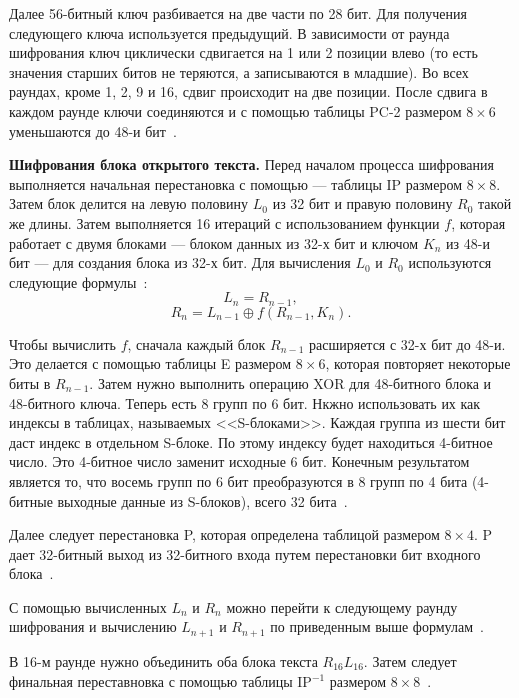\documentclass{bmstu}
\begin{document}
Далее 56-битный ключ разбивается на две части по 28 бит. 
Для получения следующего ключа используется предыдущий. 
В зависимости от раунда шифрования ключ циклически сдвигается на 1 или 2 позиции влево (то есть значения старших битов не теряются, а записываются в младшие). 
Во всех раундах, кроме 1, 2, 9 и 16, сдвиг происходит на две позиции. 
После сдвига в каждом раунде ключи соединяются и с помощью таблицы PC-2 размером $8 \times 6$ уменьшаются до 48-и бит~\cite{grabbe}.

\textbf{Шифрования блока открытого текста.} 
Перед началом процесса шифрования выполняется начальная перестановка с помощью --- таблицы IP размером $8 \times 8$. 
Затем блок делится на левую половину $L_0$ из 32 бит и правую половину $R_0$ такой же длины. 
Затем выполняется 16 итераций с использованием функции $f$, которая работает с двумя блоками --- блоком данных из 32-х бит и ключом $K_n$ из 48-и бит --- для создания блока из 32-х бит. 
Для вычисления $L_0$ и $R_0$ используются следующие формулы~\cite{grabbe}:
\begin{equation}
L_n = R_{n - 1},
\end{equation}
\begin{equation}
R_n = L_{n - 1} \oplus f(R_{n - 1}, K_n).
\end{equation}

Чтобы вычислить $f$, сначала каждый блок $R_{n - 1}$ расширяется с 32-х бит до 48-и. 
Это делается с помощью таблицы E размером $8 \times 6$, которая повторяет некоторые биты в $R_{n - 1}$. 
Затем нужно выполнить операцию XOR для 48-битного блока и 48-битного ключа. 
Теперь есть 8 групп по 6 бит. 
Нкжно использовать их как индексы в таблицах, называемых <<S-блоками>>. 
Каждая группа из шести бит даст индекс в отдельном S-блоке. 
По этому индексу будет находиться 4-битное число. 
Это 4-битное число заменит исходные 6 бит. 
Конечным результатом является то, что восемь групп по 6 бит преобразуются в 8 групп по 4 бита (4-битные выходные данные из S-блоков), всего 32 бита~\cite{grabbe}.

Далее следует перестановка P, которая определена таблицой размером $8 \times 4$. 
P дает 32-битный выход из 32-битного входа путем перестановки бит входного блока~\cite{grabbe}.

С помощью вычисленных $L_n$ и $R_n$ можно перейти к следующему раунду шифрования и вычислению $L_{n + 1}$ и $R_{n + 1}$ по приведенным выше формулам~\cite{grabbe}.

В 16-м раунде нужно объединить оба блока текста $R_{16}L_16$. 
Затем следует финальная переставновка с помощью таблицы IP$^{-1}$ размером $8 \times 8$~\cite{grabbe}.
\end{document}

